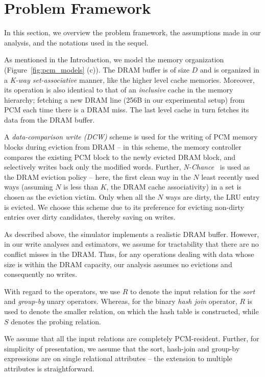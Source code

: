 \section{Problem Framework}
\label{assumptions}
In this section, we overview the problem framework, the assumptions made
in our analysis, and the notations used in the sequel.

As mentioned in the Introduction, we model the \model{} memory
organization (Figure~\ref{fig:pcm_models} (c)). The DRAM buffer is of
size $D$ and is organized in a \emph{K-way set-associative} manner, like the higher level cache memories. Moreover, its operation is also identical to that of an \emph{inclusive} cache in the memory hierarchy; fetching a new DRAM line (256B in our experimental setup) from PCM each time there is a DRAM miss. The last level cache in turn fetches its data from the DRAM buffer.

A \textit{data-comparison write (DCW)} scheme \cite{write} is used for
the writing of PCM memory blocks during eviction from DRAM -- in this
scheme, the memory controller compares the existing PCM block to the newly
evicted DRAM block, and selectively writes back only the modified words.
Further, \textit{N-Chance}~\cite{nchance} is used as the DRAM eviction
policy -- here, the first clean way in the $N$ least recently used ways
(assuming $N$ is less than $K$, the DRAM cache associativity) in a set
is chosen as the eviction victim. Only when all the $N$ ways are dirty,
the LRU entry is evicted. We choose this scheme due to its preference
for evicting non-dirty entries over dirty candidates, thereby saving
on writes.

As described above, the simulator implements a realistic DRAM
buffer. However, in our write analyses and estimators, we assume for
tractability that there are no conflict misses in the DRAM. Thus, for
any operations dealing with data whose size is within the DRAM capacity,
our analysis assumes no evictions and consequently no writes.

With regard to the operators, we use $R$ to denote the input relation
for the \textit{sort} and \textit{group-by} unary operators.  Whereas,
for the binary \textit{hash join} operator, $R$ is used to denote the
smaller relation, on which the hash table is constructed, while $S$
denotes the probing relation. 

We assume that all the input relations are completely PCM-resident.
Further, for simplicity of presentation, we assume that the sort,
hash-join and group-by expressions are on single relational attributes --
the extension to multiple attributes is straightforward.

